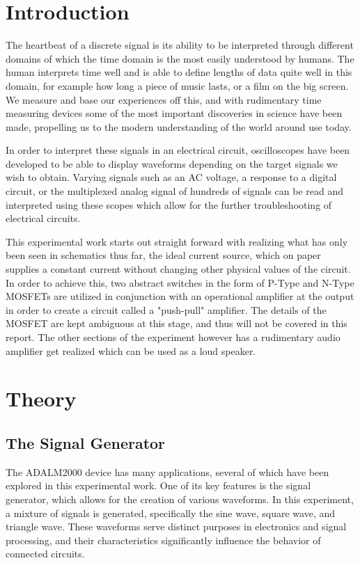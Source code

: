 \documentclass[12pt]{article}
\begin{document}
\section{Introduction}
The heartbeat of a discrete signal is its ability to be interpreted through
different domains of which the time domain is the most easily understood by
humans. The human interprets time well and is able to define lengths of data
quite well in this domain, for example how long a piece of music lasts, or a
film on the big screen. We measure and base our experiences off this, and with
rudimentary time measuring devices some of the most important discoveries in
science have been made, propelling us to the modern understanding of the world
around use today.

In order to interpret these signals in an electrical circuit, oscilloscopes have
been developed to be able to display waveforms depending on the target signals
we wish to obtain. Varying signals such as an AC voltage, a response to a
digital circuit, or the multiplexed analog signal of hundreds of signals can be
read and interpreted using these scopes which allow for the further
troubleshooting of electrical circuits.

This experimental work starts out straight forward with realizing what has only
been seen in schematics thus far, the ideal current source, which on paper
supplies a constant current without changing other physical values of the
circuit. In order to achieve this, two abstract switches in the form of P-Type
and N-Type MOSFETs are utilized in conjunction with an operational amplifier at
the output in order to create a circuit called a "push-pull" amplifier.
The details of the MOSFET are kept ambiguous at this stage, and thus will not be
covered in this report. The other sections of the experiment however has a
rudimentary audio amplifier get realized which can be used as a loud speaker.
\section{Theory}
\subsection{The Signal Generator}
The ADALM2000 device has many applications, several of which have been explored
in this experimental work. One of its key features is the signal generator,
which allows for the creation of various waveforms. In this experiment, a
mixture of signals is generated, specifically the sine wave, square wave, and
triangle wave. These waveforms serve distinct purposes in electronics and signal
processing, and their characteristics significantly influence the behavior of
connected circuits.
\end{document}
